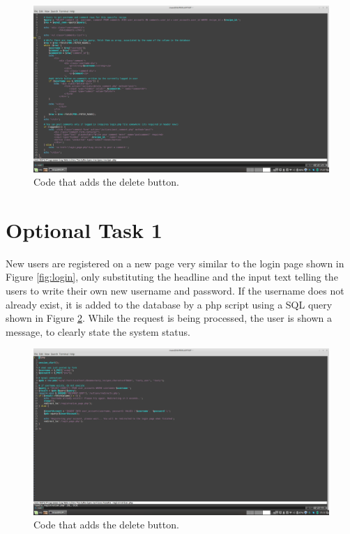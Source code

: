 \documentclass[a4paper]{scrreprt}
\begin{document}
\begin{figure}[h!]
  \begin{center}
    \includegraphics[scale=0.41]{img/delete.png}
    \caption{Code that adds the delete button.}
    \label{fig:delete}
  \end{center}
\end{figure}

\section{Optional Task 1}

New users are registered on a new page very similar to the login page shown in Figure \ref{fig:login}, only substituting the headline and the input text telling the users to write their own new username and password. If the username does not already exist, it is added to the database by a php script using a SQL query shown in Figure \ref{fig:register}. While the request is being processed, the user is shown a message, to clearly state the system status.

\begin{figure}[h!]
  \begin{center}
    \includegraphics[scale=0.41]{img/register.png}
    \caption{Code that adds the delete button.}
    \label{fig:register}
  \end{center}
\end{figure}
\end{document}
